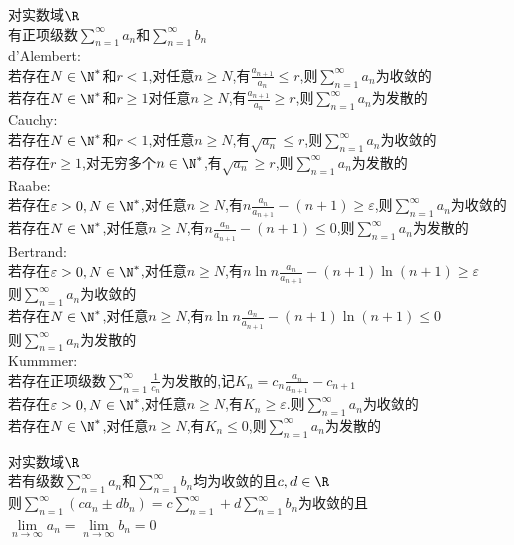 \begin{dingli}
对实数域$\R$\\
有正项级数$\sum\limits_{n=1}^{\infty}a_n$和$\sum\limits_{n=1}^{\infty}b_n$\\
d'Alembert:\\
若存在$N\in \N^*$和$r<1$,对任意$n\geq N$,有$\frac{a_{n+1}}{a_{n}}\leq r$,则$\sum\limits_{n=1}^{\infty}a_n$为收敛的\\
若存在$N\in \N^*$和$r\geq 1$对任意$n\geq N$,有$\frac{a_{n+1}}{a_{n}}\geq r$,则$\sum\limits_{n=1}^{\infty}a_n$为发散的\\
Cauchy:\\
若存在$N\in \N^*$和$r<1$,对任意$n\geq N$,有$\sqrt{a_n}\leq r$,则$\sum\limits_{n=1}^{\infty}a_n$为收敛的\\
若存在$r\geq 1$,对无穷多个$n\in\N^*$,有$\sqrt{a_n}\geq r$,则$\sum\limits_{n=1}^{\infty}a_n$为发散的\\
Raabe:\\
若存在$\varepsilon>0,N\in\N^*$,对任意$n\geq N$,有$n\frac{a_n}{a_{n+1}}-(n+1)\geq \varepsilon$,则$\sum\limits_{n=1}^{\infty}a_n$为收敛的\\
若存在$N\in\N^*$,对任意$n\geq N$,有$n\frac{a_n}{a_{n+1}}-(n+1)\leq 0$,则$\sum\limits_{n=1}^{\infty}a_n$为发散的\\
Bertrand:\\
若存在$\varepsilon>0,N\in\N^*$,对任意$n\geq N$,有$n\ln n\frac{a_n}{a_{n+1}}-(n+1)\ln (n+1)\geq \varepsilon$\\
则$\sum\limits_{n=1}^{\infty}a_n$为收敛的\\
若存在$N\in\N^*$,对任意$n\geq N$,有$n\ln n\frac{a_n}{a_{n+1}}-(n+1)\ln (n+1)\leq 0$\\
则$\sum\limits_{n=1}^{\infty}a_n$为发散的\\
Kummmer:\\
若存在正项级数$\sum\limits_{n=1}^{\infty}\frac{1}{c_n}$为发散的,记$K_n=c_n\frac{a_n}{a_{n+1}}-c_{n+1}$\\
若存在$\varepsilon>0,N\in\N^*$,对任意$n\geq N$,有$K_n\geq \varepsilon$.则$\sum\limits_{n=1}^{\infty}a_n$为收敛的\\
若存在$N\in\N^*$,对任意$n\geq N$,有$K_n\leq 0$,则$\sum\limits_{n=1}^{\infty}a_n$为发散的
\end{dingli}

\begin{dingli}
对实数域$\R$\\
若有级数$\sum\limits_{n=1}^{\infty}a_n$和$\sum\limits_{n=1}^{\infty}b_n$均为收敛的且$c,d\in \R$\\
则$\sum\limits_{n=1}^{\infty}(ca_n\pm db_n)=c\sum\limits_{n=1}^{\infty}+d\sum\limits_{n=1}^{\infty}b_n$为收敛的且$\lim\limits_{n\to\infty}a_n=\lim\limits_{n\to\infty}b_n=0$
\end{dingli}

